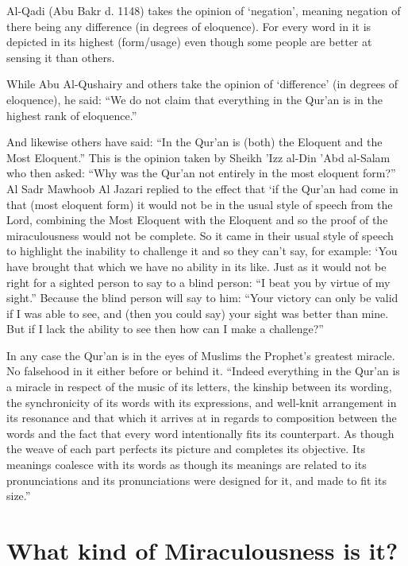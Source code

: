 \documentclass[12pt]{book}
\begin{document}
Al-Qadi (Abu Bakr d. 1148) takes the opinion of ‘negation’, meaning negation
of there being any difference (in degrees of eloquence). For every word in it
is depicted in its highest (form/usage) even though some people are better at
sensing it than others.

While Abu Al-Qushairy and others take the opinion of ‘difference’ (in degrees
of eloquence), he said: “We do not claim that everything in the Qur’an is in
the highest rank of eloquence.”

And likewise others have said: “In the Qur’an is (both) the Eloquent and the
Most Eloquent.” This is the opinion taken by Sheikh ’Izz al-Din ’Abd al-Salam
who then asked: “Why was the Qur’an not entirely in the most eloquent form?”
Al Sadr Mawhoob Al Jazari replied to the effect that ‘if the Qur’an had come in
that (most eloquent form) it would not be in the usual style of speech from the
Lord, combining the Most Eloquent with the Eloquent and so the proof of the
miraculousness would not be complete. So it came in their usual style of speech
to highlight the inability to challenge it and so they can’t say, for example:
‘You have brought that which we have no ability in its like. Just as it would
not be right for a sighted person to say to a blind person: “I beat you by
virtue of my sight.” Because the blind person will say to him: “Your victory
can only be valid if I was able to see, and (then you could say) your sight was
better than mine. But if I lack the ability to see then how can I make a
challenge?”\footnotemark


In any case the Qur’an is in the eyes of Muslims the Prophet’s greatest
miracle. No falsehood in it either before or behind it. “Indeed everything in
the Qur’an is a miracle in respect of the music of its letters, the kinship
between its wording, the synchronicity of its words with its expressions,
and well-knit arrangement in its resonance and that which it arrives at in
regards to composition between the words and the fact that every word
intentionally fits its counterpart. As though the weave of each part perfects
its picture and completes its objective. Its meanings coalesce with its
words as though its meanings are related to its pronunciations and its
pronunciations were designed for it, and made to fit its size.”\footnotemark



\section{What kind of Miraculousness is it?}
\end{document}
